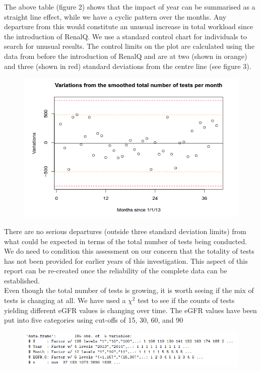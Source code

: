 \documentclass[11pt]{article}
\begin{document}
The above table (figure 2) shows that the impact of year can be summarised as a straight line effect, while we have a cyclic pattern over the months. Any departure from this would constitute an unusual increase in total workload since the introduction of RenalQ. We use a standard control chart for individuals to search for unusual results. The control limits on the plot are calculated using the data from before the introduction of RenalQ and are at two (shown in orange) and three (shown in red) standard deviations from the centre line (see figure 3).\\

\begin{figure}[htp]
\centering
\includegraphics[scale=0.50]{fig4.png}
\caption{}
\label{}
\end{figure}

There are no serious  departures (outside three standard deviation limits) from what could be expected in terms of the total number of tests being conducted. We do need to condition this assessment on our concern that the totality of tests has not been provided for earlier years of this investigation. This aspect of this report can be re-created once the reliability of the complete data can be established.\\

Even though the total number of tests is growing, it is worth seeing if the mix of tests is changing at all. We have used a $\chi^2$ test to see if the counts of tests yielding different eGFR values is changing over time. The eGFR values have been put into five categories using cut-offs of 15, 30, 60, and 90\\

\begin{figure}[htp]
\centering
\includegraphics[scale=0.50]{fig5.png}
\caption{}
\label{}
\end{figure}
\end{document}
